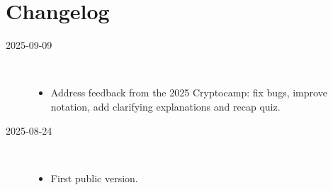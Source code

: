 \documentclass[
  a4paper,
  orivec,oribibl]{llncs}
\begin{document}
  \section*{Changelog}\label{sec:changelog}
  \begin{description}
    \item[2025-09-09]\
          \begin{itemize}
            \item Address feedback from the 2025 Cryptocamp: fix bugs, improve notation, add clarifying explanations and recap quiz.
          \end{itemize}
    \item[2025-08-24]\
          \begin{itemize}
            \item First public version.
          \end{itemize}
  \end{description}
  \vspace{-2em}
\fi

{}
\printbibliography\label{sec:bib}
\end{document}

